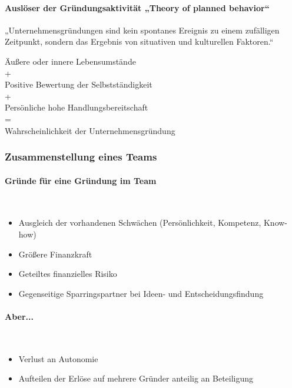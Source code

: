             \paragraph*{ Auslöser der Gründungsaktivität „Theory of planned behavior“}
                „Unternehmensgründungen sind kein spontanes Ereignis zu einem zufälligen Zeitpunkt, sondern das Ergebnis von situativen und kulturellen Faktoren.“\newpage
                \begin{center}
                Äußere oder innere Lebensumstände\\+\\
                Positive Bewertung der Selbstständigkeit\\+\\
                Persönliche hohe Handlungsbereitschaft\\=\\
                Wahrscheinlichkeit der Unternehmensgründung \end{center}
        \subsubsection{Zusammenstellung eines Teams}
            \paragraph{Gründe für eine Gründung im Team}~\\
            \begin{itemize}
                \item Ausgleich der vorhandenen Schwächen (Persönlichkeit, Kompetenz, Know-how)
                \item Größere Finanzkraft
                \item Geteiltes finanzielles Risiko 
                \item Gegenseitige Sparringspartner bei Ideen- und Entscheidungsfindung
            \end{itemize}
            \paragraph{Aber...}~\\
            \begin{itemize}
                \item Verlust an Autonomie
                \item Aufteilen der Erlöse auf mehrere Gründer anteilig an Beteiligung
            \end{itemize}
